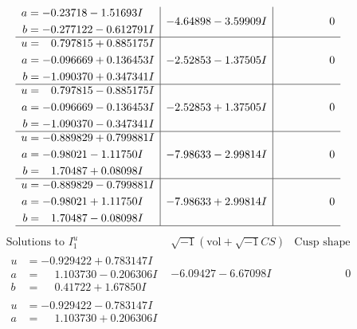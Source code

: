 \documentclass[1p]{elsarticle_modified}
\theoremstyle{definition}
\newcommand{\I}{\sqrt{-1}}
\begin{document}
$$\begin{array}{c|c|c}
\begin{aligned}
a &= -0.23718 - 1.51693 I \\
b &= -0.277122 - 0.612791 I\end{aligned}
 & -4.64898 - 3.59909 I & \phantom{-0.000000 } 0 \\ \hline\begin{aligned}
u &= \phantom{-}0.797815 + 0.885175 I \\
a &= -0.096669 + 0.136453 I \\
b &= -1.090370 + 0.347341 I\end{aligned}
 & -2.52853 - 1.37505 I & \phantom{-0.000000 } 0 \\ \hline\begin{aligned}
u &= \phantom{-}0.797815 - 0.885175 I \\
a &= -0.096669 - 0.136453 I \\
b &= -1.090370 - 0.347341 I\end{aligned}
 & -2.52853 + 1.37505 I & \phantom{-0.000000 } 0 \\ \hline\begin{aligned}
u &= -0.889829 + 0.799881 I \\
a &= -0.98021 - 1.11750 I \\
b &= \phantom{-}1.70487 + 0.08098 I\end{aligned}
 & -7.98633 - 2.99814 I & \phantom{-0.000000 } 0 \\ \hline\begin{aligned}
u &= -0.889829 - 0.799881 I \\
a &= -0.98021 + 1.11750 I \\
b &= \phantom{-}1.70487 - 0.08098 I\end{aligned}
 & -7.98633 + 2.99814 I & \phantom{-0.000000 } 0\\
 \hline 
 \end{array}$$\newpage$$\begin{array}{c|c|c}  
\text{Solutions to }I^u_{1}& \I (\text{vol} + \sqrt{-1}CS) & \text{Cusp shape}\\
 \hline 
\begin{aligned}
u &= -0.929422 + 0.783147 I \\
a &= \phantom{-}1.103730 - 0.206306 I \\
b &= \phantom{-}0.41722 + 1.67850 I\end{aligned}
 & -6.09427 - 6.67098 I & \phantom{-0.000000 } 0 \\ \hline\begin{aligned}
u &= -0.929422 - 0.783147 I \\
a &= \phantom{-}1.103730 + 0.206306 I \\

\end{aligned}
\end{array}$$
\end{document}
